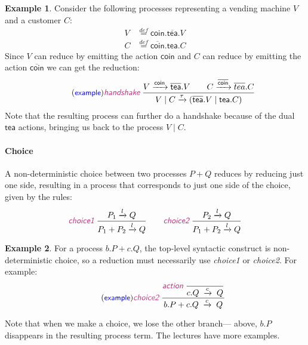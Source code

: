 \documentclass{article}
\newcommand{\exampleLabel}{\tag{\small{\textcolor{blue}{\textsf{example}}}}}
\theoremstyle{definition}
\newtheorem{example}{Example}
\newcommand{\trule}[1]{\textcolor{labelColor}{\textit{\textsf{#1}}}\;}
\begin{document}
\begin{example}
  Consider the following processes representing a vending machine
  $V$ and a customer $C$:
  \begin{align*}
V  & {\mathrel{\mathop{=}\limits^{{def}}}} 
     {\mathsf{coin}}.\overline{\mathsf{tea}}.V \\
C & {\mathrel{\mathop{=}\limits^{{def}}}} 
\overline{\mathsf{coin}}.{\mathsf{tea}}.C   
  \end{align*}
  Since $V$ can reduce by emitting the action $\mathsf{coin}$ and
  $C$ can reduce by emitting the action $\overline{\mathsf{coin}}$
   we can get the reduction:
  \begin{align*}
    \exampleLabel{}
    \trule{handshake}
    \dfrac{V \xrightarrow{\mathsf{coin}} \overline{\mathsf{tea}}.V
    \qquad
    C \xrightarrow{\overline{\mathsf{coin}}} \overline{tea}.C}
    {V \mid C \xrightarrow{\tau} (\overline{\mathsf{tea}}.V \mid \mathsf{tea}.C)}
  \end{align*}
  Note that the resulting process can further do a handshake because
  of the dual $\mathsf{tea}$ actions, bringing us back to the process
  $V \mid C$.
\end{example}

\paragraph{Choice}
A non-deterministic choice between two processes $P + Q$ reduces
by reducing just one side, resulting in a process that corresponds
to just one side of the choice, given by the rules:
%
\begin{align*}
\trule{choice1}\dfrac{P_1 \xrightarrow{l} Q}{P_1 + P_2 \xrightarrow{l} Q}
\qquad
\trule{choice2}\dfrac{P_2 \xrightarrow{l} Q}{P_1 + P_2 \xrightarrow{l} Q} 
\end{align*}
%
\begin{example} For a process $b.P + c.Q$, the top-level syntactic
  construct is non-deterministic choice, so a reduction must necessarily
   use \trule{choice1} or \trule{choice2}. For example:
  \begin{align*}
    \exampleLabel{}
\trule{choice2}
  \dfrac{\trule{action}\dfrac{}{c . Q \; \xrightarrow{c} \; Q}}
        {b . P + c.Q \; \xrightarrow{c} \; Q}
\end{align*}
\end{example}
%
\noindent
Note that when we make a choice, we lose the other branch--- above,
$b.P$ disappears in the resulting process term. The lectures have more examples.
\end{document}
